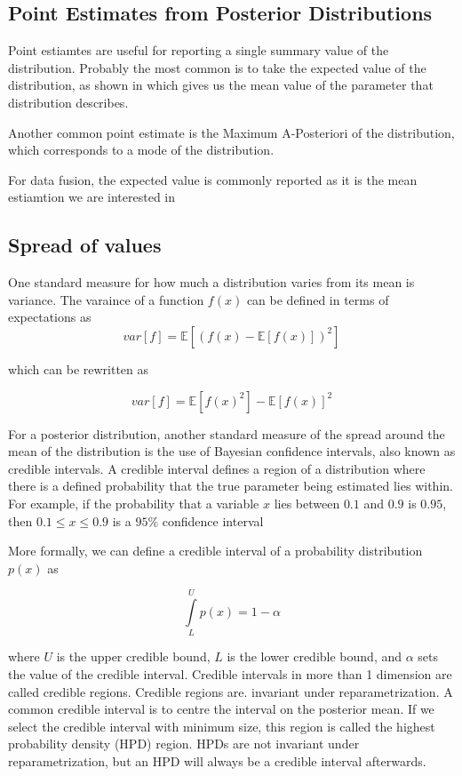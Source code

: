 %	

\subsection{Point Estimates from Posterior Distributions}

Point estiamtes are useful for reporting a single summary value of the distribution. Probably the most common is to take the expected value of the distribution, as shown in  which gives us the mean value of the parameter that distribution describes. 

Another common point estimate is the Maximum A-Posteriori of the distribution, which corresponds to a mode of the distribution.

For data fusion, the expected value is commonly reported as it is the mean estiamtion we are interested in 


\subsection{Spread of values}
One standard measure for how much a distribution varies from its mean is variance. The varaince of a function $f(x)$ can be defined in terms of expectations as 
\[ 
var[f]=\mathbb{E}[(f(x)-\mathbb{E}[f(x)])^2]
\]

which can be rewritten as

\[ 
var[f]=\mathbb{E}[f(x)^2]-\mathbb{E}[f(x)]^2
\]


For a posterior distribution, another standard measure of the spread around the mean of the distribution is the use of Bayesian confidence intervals, also known as credible intervals. A credible interval defines a region of a distribution where there is a defined probability that the true parameter being estimated lies within.  For example, if the probability that a variable $x$ lies between $0.1$ and $0.9$ is $0.95$, then $0.1 \leq  x \leq 0.9$ is a $95\% $ confidence interval

More formally, we can define a credible interval of a probability distribution $p(x)$ as

\[ 
\int\limits_L^U p(x)=1-\alpha
\]

where $U$ is the upper credible bound, $L$ is the lower credible bound, and $\alpha$ sets the value of the credible interval. Credible intervals in more than 1 dimension are called credible regions. Credible regions are. invariant under reparametrization. A common credible interval is to centre the interval on the posterior mean. If we select the credible interval with minimum size, this region is called the highest probability density (HPD) region. HPDs are not invariant under reparametrization, but an HPD will always be a credible interval afterwards. 


